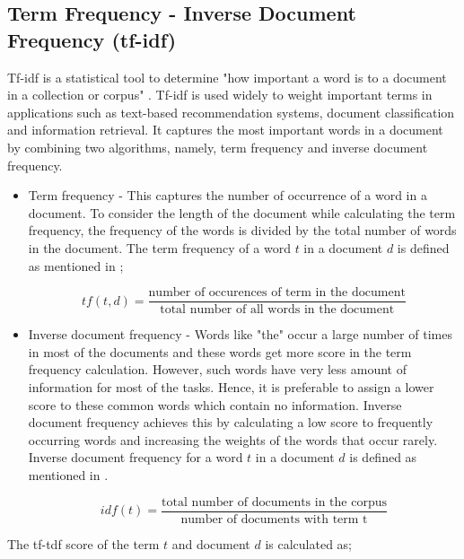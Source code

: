 	
	\subsection{Term Frequency - Inverse Document Frequency (tf-idf)}
	
	Tf-idf is a statistical tool to determine "how important a word is to a document in a collection or corpus" \cite{tf_idf_defi}. Tf-idf is used widely to weight important terms in applications such as text-based recommendation systems, document classification and information retrieval. It captures the most important words in a document by combining two algorithms, namely, term frequency and inverse document frequency.
	
	\begin{itemize}
		\item Term frequency - This captures the number of occurrence of a word in a document. To consider the length of the document while calculating the term frequency, the frequency of the words is divided by the total number of words in the document. The term frequency of a word $t$ in a document $d$ is defined as mentioned in \cite{tf_idf_1};
		
		\begin{equation} tf(t,d) = \frac{\text{number of occurences of term in the document}}{\text{total number of all words in the document}} \end{equation} 
		
		\item Inverse document frequency - Words like "the" occur a large number of times in most of the documents and these words get more score in the term frequency calculation. However, such words have very less amount of information for most of the tasks. Hence, it is preferable to assign a lower score to these common words which contain no information. Inverse document frequency achieves this by calculating a low score to frequently occurring words and increasing the weights of the words that occur rarely. Inverse document frequency for a word $t$ in a document $d$ is defined as mentioned in \cite{tf_idf_1}. 
		
		\begin{equation} 
		idf(t) = \frac{\text{total number of documents in the corpus}}{\text{number of documents with term t}} 
		\end{equation}
		    
	\end{itemize} 
	
	The tf-tdf score of the term $t$ and document $d$ is calculated as;
	
